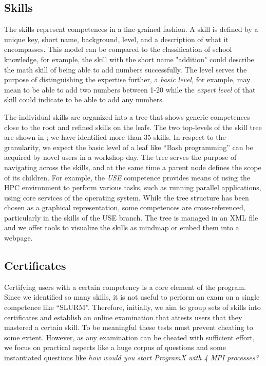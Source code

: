 \documentclass[jocse]{jocseart}
\begin{document}
\subsection{Skills}

The skills represent competences in a fine-grained fashion.
A skill is defined by a unique key, short name, background, level, and a description of what it encompasses.
This model can be compared to the classification of school knowledge, for example, the skill with the short name "addition" could describe the math skill of being able to add numbers successfully.
The level serves the purpose of distinguishing the expertise further, a \textit{basic level}, for example, may mean to be able to add two numbers between 1-20 while the \textit{expert level} of that skill could indicate to be able to add any numbers.

The individual skills are organized into a tree that shows generic competences close to the root and refined skills on the leafs.
The two top-levels of the skill tree are shown in ; we have identified more than 35 skills.
In respect to the granularity, we expect the basic level of a leaf like “Bash programming” can be acquired by novel users in a workshop day.
The tree serves the purpose of navigating across the skills, and at the same time a parent node defines the scope of its children.
For example, the \textit{USE} competence provides means of using the HPC environment to perform various tasks, such as running parallel applications, using core services of the operating system.
While the tree structure has been chosen as a graphical representation, some competences are cross-referenced, particularly in the skills of the USE branch.
The tree is managed in an XML file and we offer tools to visualize the skills as mindmap or embed them into a webpage.

\subsection{Certificates}

Certifying users with a certain competency is a core element of the program.
Since we identified so many skills, it is not useful to perform an exam on a single competence like “SLURM”.
Therefore, initially, we aim to group sets of skills into certificates and establish an online examination that attests users that they mastered a certain skill.
To be meaningful these tests must prevent cheating to some extent.
However, as any examination can be cheated with sufficient effort, we focus on practical aspects like a huge corpus of questions and some instantiated questions like \textit{how would you start ProgramX with 4 MPI processes?}
\end{document}
